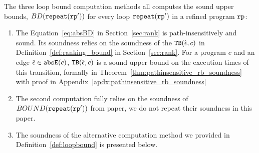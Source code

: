
The three loop bound computation methods all computes the sound upper bounds, $BD(\mathtt{repeat}(\mathtt{rp}'))$ for every loop $\mathtt{repeat}(\mathtt{rp}')$ in a refined program $\mathtt{rp}$:
\begin{enumerate}
    \item The Equation~\ref{eq:absBD} in Section~\ref{sec:rank} is path-insensitively and sound.
    Its soundness relies on the soundness of the ${\mathtt{TB}}(\hat{\mathtt{\epsilon}{}}, c)$ in Definition~\ref{def:ranking_bound} in Section~\ref{sec:rank}.
    For a program $c$ and an edge $\hat{\mathtt{\epsilon}{}} \in \mathtt{abs}{\mathtt{E}}(c)$, ${\mathtt{TB}}(\hat{\mathtt{\epsilon}{}}, c)$ is a sound upper bound on the execution times of this transition, formally in Theorem~\ref{thm:pathinsensitive_rb_soundness} with proof in Appendix~\ref{apdx:pathinsensitive_rb_soundness}    
    \item The second computation fully relies on the soundness of $BOUND(\mathtt{repeat}(\mathtt{rp}'))$ from paper\cite{GulwaniJK09}, we do not repeat their soundness in this paper.
    \item   The soundness of the alternative computation method we provided in Definition~\ref{def:loopbound} is presented below.
  \end{enumerate}

